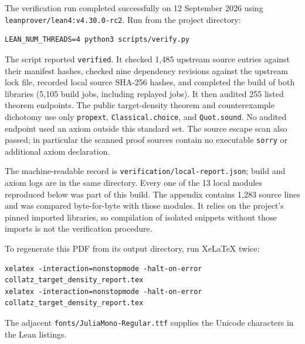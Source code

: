 The verification run completed successfully on 12 September 2026 using
\texttt{leanprover/lean4:v4.30.0-rc2}. Run from the project directory:
\begin{Verbatim}[breaklines=true]
LEAN_NUM_THREADS=4 python3 scripts/verify.py
\end{Verbatim}
The script reported \texttt{verified}. It checked 1,485 upstream source
entries against their manifest hashes, checked nine dependency revisions
against the upstream lock file, recorded local source SHA-256 hashes,
and completed the build of both libraries (5,105 build jobs, including
replayed jobs). It then audited 255 listed theorem endpoints. The public
target-density theorem and counterexample dichotomy use only
\texttt{propext}, \texttt{Classical.choice}, and \texttt{Quot.sound}.
No audited endpoint used an axiom outside this standard set. The source
escape scan also passed; in particular the scanned proof sources contain
no executable \texttt{sorry} or additional axiom declaration.

The machine-readable record is \texttt{verification/local-report.json};
build and axiom logs are in the same directory. Every one of the 13 local
modules reproduced below was part of this build. The appendix contains
1,283 source lines and was compared byte-for-byte with those modules.
It relies on the project's pinned imported libraries, so compilation of
isolated snippets without those imports is not the verification procedure.

To regenerate this PDF from its output directory, run XeLaTeX twice:
\begin{Verbatim}[breaklines=true]
xelatex -interaction=nonstopmode -halt-on-error collatz_target_density_report.tex
xelatex -interaction=nonstopmode -halt-on-error collatz_target_density_report.tex
\end{Verbatim}
The adjacent \texttt{fonts/JuliaMono-Regular.ttf} supplies the Unicode
characters in the Lean listings.
